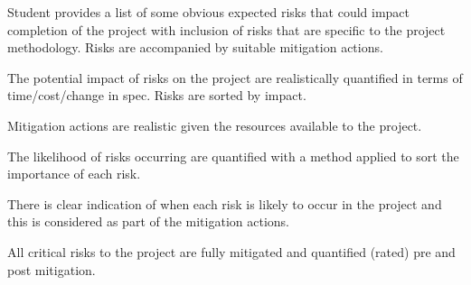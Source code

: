 Student provides a list of some obvious expected risks that could impact completion of the project with inclusion of risks that are specific to the project methodology. Risks are accompanied by suitable mitigation actions.

The potential impact of risks on the project are realistically quantified in terms of time/cost/change in spec. Risks are sorted by impact.

Mitigation actions are realistic given the resources available to the project.

The likelihood of risks occurring are quantified with a method applied to sort the importance of each risk.

There is clear indication of when each risk is likely to occur in the project and this is considered as part of the mitigation actions.

All critical risks to the project are fully mitigated and quantified (rated) pre and post mitigation.